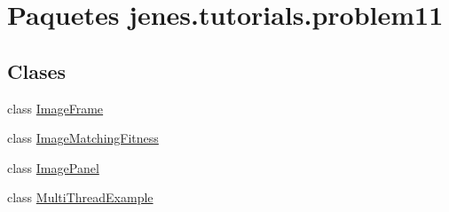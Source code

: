 \hypertarget{namespacejenes_1_1tutorials_1_1problem11}{\section{Paquetes jenes.\-tutorials.\-problem11}
\label{namespacejenes_1_1tutorials_1_1problem11}
}
\subsection*{Clases}
\begin{DoxyCompactItemize}
\item 
class \hyperlink{classjenes_1_1tutorials_1_1problem11_1_1_image_frame}{Image\-Frame}
\item 
class \hyperlink{classjenes_1_1tutorials_1_1problem11_1_1_image_matching_fitness}{Image\-Matching\-Fitness}
\item 
class \hyperlink{classjenes_1_1tutorials_1_1problem11_1_1_image_panel}{Image\-Panel}
\item 
class \hyperlink{classjenes_1_1tutorials_1_1problem11_1_1_multi_thread_example}{Multi\-Thread\-Example}
\end{DoxyCompactItemize}
